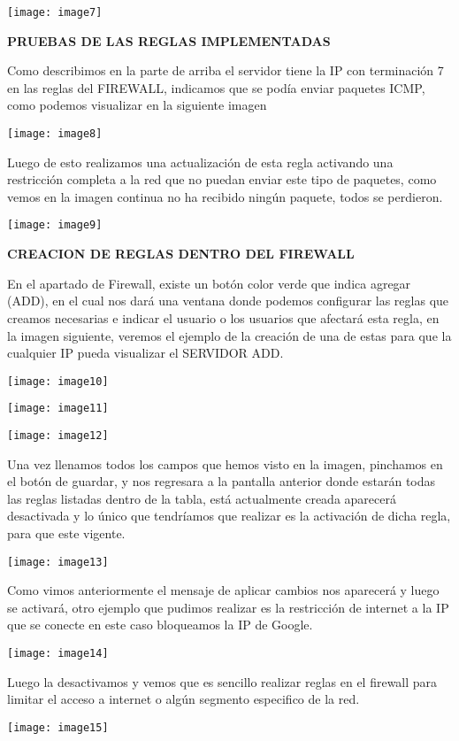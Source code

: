 \documentclass{article} %
\begin{document}
\noindent \texttt{[image: image7]}

\noindent \textbf{PRUEBAS DE LAS REGLAS IMPLEMENTADAS }

\noindent Como describimos en la parte de arriba el servidor tiene la IP con terminaci\'{o}n 7 en las reglas del FIREWALL, indicamos que se pod\'{i}a enviar paquetes ICMP, como podemos visualizar en la siguiente imagen

\noindent 

\noindent \texttt{[image: image8]}

\noindent Luego de esto realizamos una actualizaci\'{o}n de esta regla activando una restricci\'{o}n completa a la red que no puedan enviar este tipo de paquetes, como vemos en la imagen continua no ha recibido ning\'{u}n paquete, todos se perdieron.

\noindent \texttt{[image: image9]}

\noindent 

\noindent \textbf{CREACION DE REGLAS DENTRO DEL FIREWALL}

\noindent En el apartado de Firewall, existe un bot\'{o}n color verde que indica agregar (ADD), en el cual nos dar\'{a} una ventana donde podemos configurar las reglas que creamos necesarias e indicar el usuario o los usuarios que afectar\'{a} esta regla, en la imagen siguiente, veremos el ejemplo de la creaci\'{o}n de una de estas para que la cualquier IP pueda visualizar el SERVIDOR ADD.

\noindent \texttt{[image: image10]}

\noindent \texttt{[image: image11]}

\noindent \texttt{[image: image12]}

\noindent Una vez llenamos todos los campos que hemos visto en la imagen, pinchamos en el bot\'{o}n de guardar, y nos regresara a la pantalla anterior donde estar\'{a}n todas las reglas listadas dentro de la tabla, est\'{a} actualmente creada aparecer\'{a} desactivada y lo \'{u}nico que tendr\'{i}amos que realizar es la activaci\'{o}n de dicha regla, para que este vigente. 

\noindent \texttt{[image: image13]}

\noindent 

\noindent Como vimos anteriormente el mensaje de aplicar cambios nos aparecer\'{a} y luego se activar\'{a}, otro ejemplo que pudimos realizar es la restricci\'{o}n de internet a la IP que se conecte en este caso bloqueamos la IP de Google.

\noindent  \texttt{[image: image14]}

\noindent 

\noindent Luego la desactivamos y vemos que es sencillo realizar reglas en el firewall para limitar el acceso a internet o alg\'{u}n segmento especifico de la red.

\noindent 

\noindent \texttt{[image: image15]}
\end{document}
